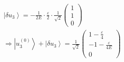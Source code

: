 \begin{equation}\begin{split}
\left |\delta u_3 \right\rangle=-\frac{1}{2E}\cdot \frac{\varepsilon}{2}\cdot \frac{1}{\sqrt{2}}\left(\begin{matrix}1\\1\\0\end{matrix}\right)\\
\Longrightarrow \left |u_3^{\left(0\right)} \right\rangle+\left |\delta u_3 \right\rangle=\frac{1}{\sqrt{2}}\left(\begin{matrix}1-\frac{\varepsilon}{4}\\-1-\frac{\varepsilon}{4E}\\0\end{matrix}\right)
\end{split}\end{equation}